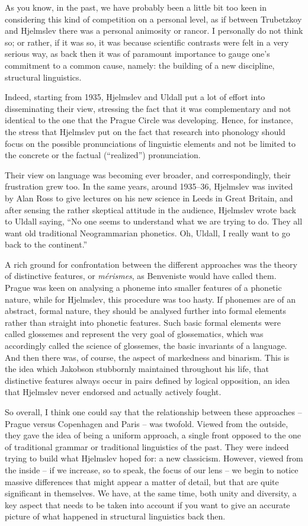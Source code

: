 As you know, in the past, we have probably been a little bit too keen in considering this kind of competition on a personal level, as if between Trubetzkoy and Hjelmslev there was a personal animosity or rancor. I personally do not think so; or rather, if it was so, it was because scientific contrasts were felt in a very serious way, as back then it was of paramount importance to gauge one’s commitment to a common cause, namely: the building of a new discipline, structural linguistics. 

Indeed, starting from 1935, Hjelmslev and Uldall put a lot of effort into disseminating their view, stressing the fact that it was complementary and not identical to the one that the Prague Circle was developing. Hence, for instance, the stress that Hjelmslev put on the fact that research into phonology should focus on the possible pronunciations of linguistic elements and not be limited to the concrete or the factual (“realized”) pronunciation. 

Their view on language was becoming ever broader, and correspondingly, their frustration grew too. In the same years, around 1935–36, Hjelmslev was invited by Alan Ross to give lectures on his new science in Leeds in Great Britain, and after sensing the rather skeptical attitude in the audience, Hjelmslev wrote back to Uldall saying, “No one seems to understand what we are trying to do. They all want old traditional Neogrammarian phonetics. Oh, Uldall, I really want to go back to the continent.” 

A rich ground for confrontation between the different approaches was the theory of distinctive features, or \textit{mérismes}, as Benveniste would have called them. Prague was keen on analysing a phoneme into smaller features of a phonetic nature, while for Hjelmslev, this procedure was too hasty. If phonemes are of an abstract, formal nature, they should be analysed further into formal elements rather than straight into phonetic features. Such basic formal elements were called glossemes and represent the very goal of glossematics, which was accordingly called the science of glossemes, the basic invariants of a language. And then there was, of course, the aspect of markedness and binarism. This is the idea which Jakobson stubbornly maintained throughout his life, that distinctive features always occur in pairs defined by logical opposition, an idea that Hjelmslev never endorsed and actually actively fought. 

So overall, I think one could say that the relationship between these approaches – Prague versus Copenhagen and Paris – was twofold. Viewed from the outside, they gave the idea of being a uniform approach, a single front opposed to the one of traditional grammar or traditional linguistics of the past. They were indeed trying to build what Hjelmslev hoped for: a new classicism. However, viewed from the inside – if we increase, so to speak, the focus of our lens – we begin to notice massive differences that might appear a matter of detail, but that are quite significant in themselves. We have, at the same time, both unity and diversity, a key aspect that needs to be taken into account if you want to give an accurate picture of what happened in structural linguistics back then.


